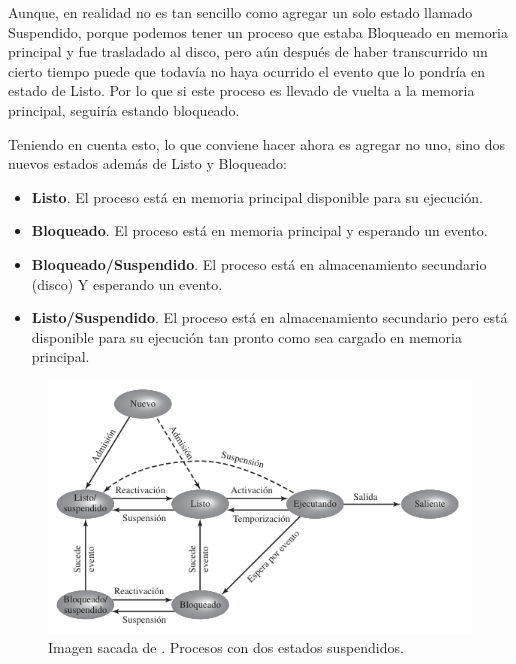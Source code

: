 \documentclass[12pt]{article}
\begin{document}
  Aunque, en realidad no es tan sencillo como agregar un solo estado llamado Suspendido, porque podemos tener un proceso que estaba Bloqueado en memoria principal y fue trasladado al disco, pero aún después de haber transcurrido un cierto tiempo puede que todavía no haya ocurrido el evento que lo pondría en estado de Listo. Por lo que si este proceso es llevado de vuelta a la memoria principal, seguiría estando bloqueado. 

  Teniendo en cuenta esto, lo que conviene hacer ahora es agregar no uno, sino dos nuevos estados además de Listo y Bloqueado:
  \begin{itemize}
    \item \textbf{Listo}. El proceso está en memoria principal disponible para su ejecución.

    \item \textbf{Bloqueado}. El proceso está en memoria principal y esperando un evento.

    \item \textbf{Bloqueado/Suspendido}. El proceso está en almacenamiento secundario (disco) Y esperando un evento.

    \item \textbf{Listo/Suspendido}. El proceso está en almacenamiento secundario pero está disponible para su ejecución tan pronto como sea cargado en memoria principal.
  \end{itemize}

  \begin{figure}[H]
    \centering
    \includegraphics[width=0.8\linewidth]{imagenes/procesos-suspendidos.png}
    \caption{Imagen sacada de \parencite{sostallings}. Procesos con dos estados suspendidos.}
    \label{fig:proc-suspendidos}
  \end{figure}
\end{document}
